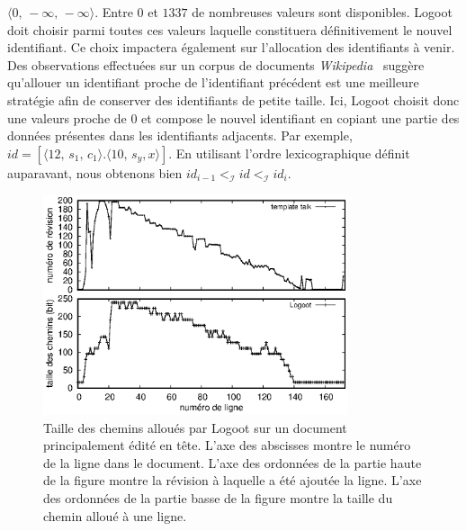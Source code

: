 $\langle 0,\, -\infty ,\, -\infty \rangle$.  Entre $0$ et $1337$ de nombreuses
valeurs sont disponibles.  Logoot doit choisir parmi toutes ces valeurs laquelle
constituera définitivement le nouvel identifiant. Ce choix impactera également
sur l'allocation des identifiants à venir.
Des observations effectuées sur un corpus de documents
\emph{Wikipedia}~\cite{wikipedia} suggère qu'allouer un identifiant proche de
l'identifiant précédent est une meilleure stratégie afin de conserver des
identifiants de petite taille.  Ici, Logoot choisit donc une valeurs proche de
$0$ et compose le nouvel identifiant en copiant une partie des données présentes
dans les identifiants adjacents. Par exemple,
$id = [\langle 12,\, s_1,\,c_1 \rangle.\langle 10,\,s_y, x\rangle]$.  En
utilisant l'ordre lexicographique définit auparavant, nous obtenons bien
$id_{i-1} <_\mathcal{I} id <_\mathcal{I} id_i$.

\begin{figure}
  \begin{center}
    \includegraphics[width=0.8\textwidth]{img/lseq/motivationlogoot.eps}
    \caption[Taille des chemins alloués par Logoot sur un document édité en
    tête]{\label{repl:img:motivationlogoot} Taille des chemins alloués par
      Logoot sur un document principalement édité en tête. L'axe des abscisses
      montre le numéro de la ligne dans le document. L'axe des ordonnées de la
      partie haute de la figure montre la révision à laquelle a été ajoutée la
      ligne. L'axe des ordonnées de la partie basse de la figure montre la taille
      du chemin alloué à une ligne.}
  \end{center}
\end{figure}

